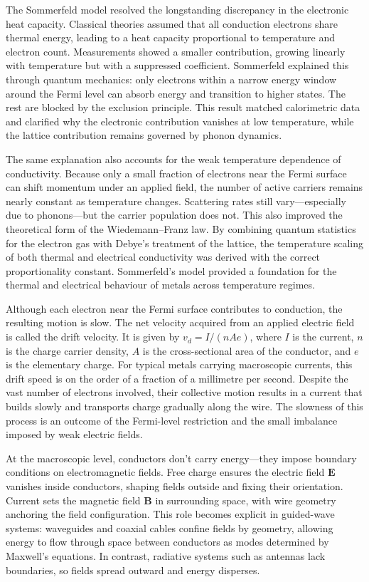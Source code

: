The Sommerfeld model resolved the longstanding discrepancy in the electronic heat capacity. Classical theories assumed that all conduction electrons share thermal energy, leading to a heat capacity proportional to temperature and electron count. Measurements showed a smaller contribution, growing linearly with temperature but with a suppressed coefficient. Sommerfeld explained this through quantum mechanics: only electrons within a narrow energy window around the Fermi level can absorb energy and transition to higher states. The rest are blocked by the exclusion principle. This result matched calorimetric data and clarified why the electronic contribution vanishes at low temperature, while the lattice contribution remains governed by phonon dynamics.

The same explanation also accounts for the weak temperature dependence of conductivity. Because only a small fraction of electrons near the Fermi surface can shift momentum under an applied field, the number of active carriers remains nearly constant as temperature changes. Scattering rates still vary—especially due to phonons—but the carrier population does not. This also improved the theoretical form of the Wiedemann–Franz law. By combining quantum statistics for the electron gas with Debye's treatment of the lattice, the temperature scaling of both thermal and electrical conductivity was derived with the correct proportionality constant. Sommerfeld's model provided a foundation for the thermal and electrical behaviour of metals across temperature regimes.

Although each electron near the Fermi surface contributes to conduction, the resulting motion is slow. The net velocity acquired from an applied electric field is called the drift velocity. It is given by $v_d = I / (n A e)$, where $I$ is the current, $n$ is the charge carrier density, $A$ is the cross-sectional area of the conductor, and $e$ is the elementary charge. For typical metals carrying macroscopic currents, this drift speed is on the order of a fraction of a millimetre per second. Despite the vast number of electrons involved, their collective motion results in a current that builds slowly and transports charge gradually along the wire. The slowness of this process is an outcome of the Fermi-level restriction and the small imbalance imposed by weak electric fields.

At the macroscopic level, conductors don't carry energy—they impose boundary conditions on electromagnetic fields. Free charge ensures the electric field $\mathbf{E}$ vanishes inside conductors, shaping fields outside and fixing their orientation. Current sets the magnetic field $\mathbf{B}$ in surrounding space, with wire geometry anchoring the field configuration. This role becomes explicit in guided-wave systems: waveguides and coaxial cables confine fields by geometry, allowing energy to flow through space between conductors as modes determined by Maxwell's equations. In contrast, radiative systems such as antennas lack boundaries, so fields spread outward and energy disperses.

